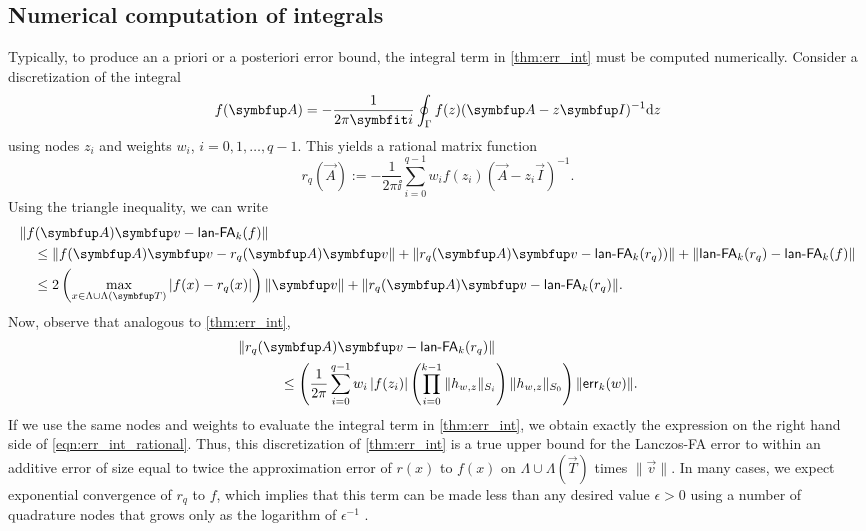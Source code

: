 \subsection{Numerical computation of integrals}
\label{sec:numerical_integral}
Typically, to produce an a priori or a posteriori error bound, the integral term in \cref{thm:err_int} must be computed numerically.
Consider a discretization of the integral
\begin{equation*}
    \fA = -\frac{1}{2\pi \ii} \oint_{\Gamma} f(z) (\vec{A}-z\vec{I})^{-1} \d{z}
\end{equation*}
using nodes \( z_i \) and weights \( w_i \), \( i=0,1,\ldots,q-1 \). 
This yields a rational matrix function
\begin{equation*}
    r_q(\vec{A}) := -\frac{1}{2\pi \ii} \sum_{i=0}^{q-1}  w_i f(z_i) (\vec{A}-z_i\vec{I})^{-1}. 
\end{equation*}
Using the triangle inequality, we can write
\begin{align}
\hspace{1em}&\hspace{-1em}\nonumber
\| \fA \vec{v} - \lan_k(f) \|
\\&\leq 
\nonumber
\| \fA \vec{v} - r_q(\vec{A}) \vec{v} \| + \| r_q(\vec{A}) \vec{v} - \lan_k(r_q)) \| + \| \lan_k(r_q) - \lan_k(f) \|
\\&\leq 2  \left( \max_{x \in \Lambda \cup \Lambda(\vec{T})} | f(x) - r_q(x) | \right) \|\vec{v}\|  + \| r_q(\vec{A}) \vec{v} - \lan_k(r_q) \|. \label{eqn:triangle_ineq_rational}
\end{align}
Now, observe that analogous to \cref{thm:err_int},
\begin{align}
    \label{eqn:err_int_rational}
    \hspace{3em}&\hspace{-3em}\nonumber
    \| r_q(\vec{A})\vec{v} - \lan_k(r_q) \| 
    \\&\leq \left( \frac{1}{2\pi} \sum_{i=0}^{q-1} w_i \, |f(z_i)|  \left( \prod_{i=0}^{k-1} \|h_{w,z}\|_{S_i} \right)  \|h_{w,z}\|_{S_0} \right) \| \err_k(w) \|.
\end{align}
If we use the same nodes and weights to evaluate the integral term in \cref{thm:err_int}, we obtain exactly the expression on the right hand side of \cref{eqn:err_int_rational}.
Thus, this discretization of \cref{thm:err_int} is a true upper bound for the Lanczos-FA error to within an additive error of size equal to twice the approximation error of \( r(x) \) to \( f(x) \) on \( \Lambda \cup \Lambda(\vec{T}) \) times \( \| \vec{v} \| \).
In many cases, we expect exponential convergence of \( r_q \) to \( f \), which implies that this term can be made less than any desired value $\epsilon > 0$ using a number of quadrature nodes that grows only as the logarithm of \( \epsilon^{-1} \) \cite{hale_higham_trefethen_08,trefethen_weideman_14}.

